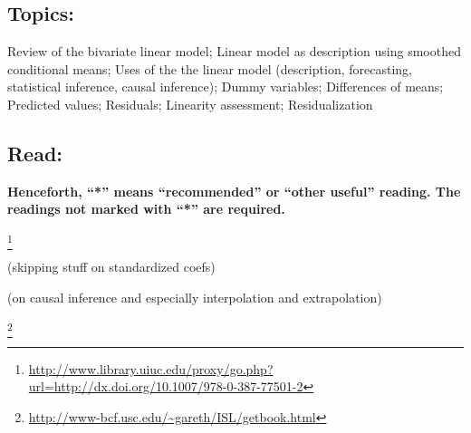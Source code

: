 \documentclass[10pt]{article}
\begin{document}
\subsection{Topics:} Review of the bivariate linear model; Linear
model as description using smoothed conditional means; Uses of the the
linear model (description, forecasting, statistical inference, causal
inference); Dummy variables; Differences of means; Predicted values;
Residuals; Linearity assessment; Residualization







\subsection{Read:}
\textbf{Henceforth, ``*'' means ``recommended'' or ``other useful''
  reading. The readings not marked with ``*'' are required.}


\citealp[Pages 1--8]{berk2008statistical}\footnote{\url{http://www.library.uiuc.edu/proxy/go.php?url=http://dx.doi.org/10.1007/978-0-387-77501-2}}

\citealp[Chap 6--7]{berk04} (skipping stuff on standardized coefs)

\citealp[Chap 9.0--9.2]{gelman2007dau} (on causal inference and especially interpolation and extrapolation)

\citealp[skim Chap 3 (on linear models) and Chap 6.2.2 and 6.2.3 on the lasso ]{james2013introduction}
\footnote{\url{http://www-bcf.usc.edu/~gareth/ISL/getbook.html}}
\end{document}
